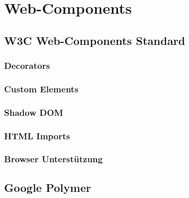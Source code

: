 \section{Web-Components}
\label{sec:3_Web_Components}





\subsection{W3C Web-Components Standard}
\label{sec:3_W3C}



\subsubsection{Decorators}
\label{sec:3_WC_Decorators}

\subsubsection{Custom Elements}
\label{sec:3_WC_Elements}

\subsubsection{Shadow DOM}
\label{sec:3_WC_Shadow_DOM}

\subsubsection{HTML Imports}
\label{sec:3_WC_Imports}

\subsubsection{Browser Unterstützung}
\label{sec:3_WC_Support}

\subsection{Google Polymer}
\label{sec:3_Polymer}




